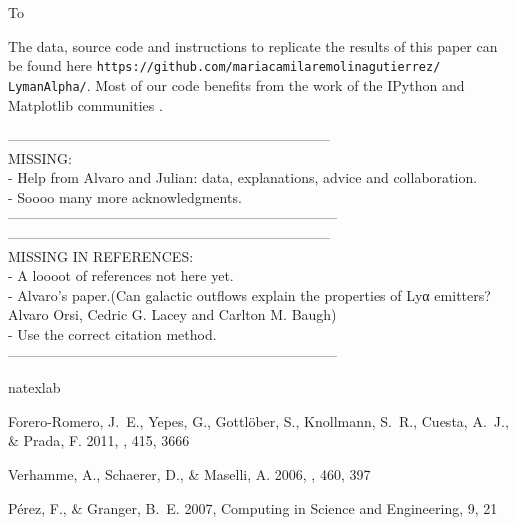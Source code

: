 \documentclass{emulateapj}
\begin{document}
To 

The data, source code and instructions to
replicate the results of this paper can be found
here {\texttt{https://github.com/mariacamilaremolinagutierrez/ LymanAlpha/}}.
Most of our code benefits from the work of the IPython and Matplotlib
communities \citep{IPython,matplotlib}.

---------------------------------------------------------------------\\
MISSING: \\
- Help from Alvaro and Julian: data, explanations, advice and collaboration. \\
- Soooo many more acknowledgments.\\
-----------------------------------------------------------------------\\

---------------------------------------------------------------------\\
MISSING IN REFERENCES: \\
- A loooot of references not here yet.\\
- Alvaro's paper.(Can galactic outflows explain the properties of Lyα emitters?
Alvaro Orsi, Cedric G. Lacey and Carlton M. Baugh)\\
- Use the correct citation method. \\
-----------------------------------------------------------------------\\


\begin{thebibliography}{38}
\expandafter\ifx\csname natexlab\endcsname\relax\def\natexlab#1{#1}\fi

{Forero-Romero}, J.~E., {Yepes}, G., {Gottl{\"o}ber}, S., {Knollmann}, S.~R.,
  {Cuesta}, A.~J., \& {Prada}, F. 2011, \mnras, 415, 3666
  
{Verhamme}, A., {Schaerer}, D., \& {Maselli}, A. 2006, \aap, 460, 397

P\'erez, F., \& Granger, B.~E. 2007, Computing in Science and Engineering, 9, 21

\end{thebibliography}

\newpage
\end{document}
